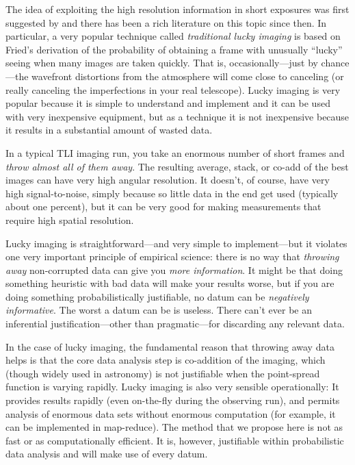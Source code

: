 \documentclass[12pt,preprint]{aastex}
\begin{document}
The idea of exploiting the high resolution information in short
exposures was first suggested by \citet{labeyrie} and there has
been a rich literature on this topic since then. In particular,
a very popular technique called \emph{traditional lucky imaging}
\citep[TLI;][]{law} is based on Fried's derivation of the probability
of obtaining a
frame with unusually ``lucky'' seeing when many images are taken
quickly. That is, occasionally---just by chance---the wavefront
distortions from the atmosphere will come close to canceling (or
really canceling the imperfections in your real telescope).
Lucky imaging is very popular because it is simple to understand and
implement and it can be used with very inexpensive equipment, but as a
technique it is not inexpensive because it results in a substantial
amount of wasted data.

In a typical TLI imaging run, you take an enormous number
of short frames and \emph{throw almost all of them away}.  The
resulting average, stack, or co-add of the best images can have very
high angular resolution.  It doesn't, of course, have very high
signal-to-noise, simply because so little data in the end get used
(typically about one percent), but it can be very good for making
measurements that require high spatial resolution.

Lucky imaging is straightforward---and very simple to implement---but
it violates one very important principle of empirical science: there
is no way that \emph{throwing away} non-corrupted data can give you
\emph{more information}.  It might be that doing something heuristic
with bad data will make your results worse, but if you are doing
something probabilistically justifiable, no datum can be
\emph{negatively informative}.  The worst a datum can be is useless.
There can't ever be an inferential justification---other than
pragmatic---for discarding any relevant data.

In the case of lucky imaging, the fundamental reason that throwing
away data helps is that the core data analysis step is co-addition of
the imaging, which (though widely used in astronomy) is not
justifiable when the point-spread function is varying rapidly.  Lucky
imaging is also very sensible operationally: It provides results
rapidly (even on-the-fly during the observing run), and permits
analysis of enormous data sets without enormous computation (for
example, it can be implemented in map-reduce). The method that we
propose here is not as fast or as computationally efficient.  It is,
however, justifiable within probabilistic data analysis and will
make use of every datum.
\end{document}
